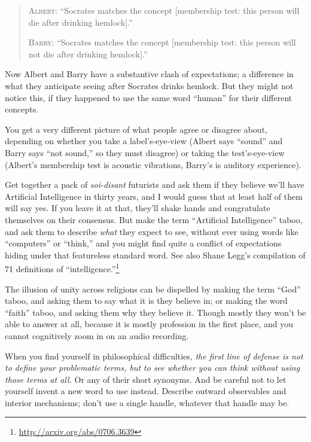 {{\begin{quotation}
{
 \textsc{Albert}: ``Socrates matches the concept
[membership test: this person will die after drinking
hemlock].''}

{
 \textsc{Barry}: ``Socrates matches the concept [membership
test: this person will not die after drinking
hemlock].''}
\end{quotation}

{
 Now Albert and Barry have a substantive clash of expectations; a
difference in what they anticipate seeing after Socrates drinks
hemlock. But they might not notice this, if they happened to use the
same word ``human'' for their
different concepts.}

{
 You get a very different picture of what people agree or disagree
about, depending on whether you take a label's-eye-view
(Albert says ``sound'' and Barry
says ``not sound,'' so they must
disagree) or taking the test's-eye-view
(Albert's membership test is acoustic vibrations,
Barry's is auditory experience).}

{
 Get together a pack of \textit{soi-disant} futurists and ask them
if they believe we'll have Artificial Intelligence in
thirty years, and I would guess that at least half of them will say
yes. If you leave it at that, they'll shake hands and
congratulate themselves on their consensus. But make the term
``Artificial Intelligence'' taboo,
and ask them to describe \textit{what} they expect to see, without ever
using words like ``computers'' or
``think,'' and you might find quite
a conflict of expectations hiding under that featureless standard word.
See also Shane Legg's compilation of 71 definitions of
``intelligence.''\footnote{\url{http://arxiv.org/abs/0706.3639}}}

{
 The illusion of unity across religions can be dispelled by making
the term ``God'' taboo, and asking
them to say what it is they believe in; or making the word
``faith'' taboo, and asking them why
they believe it. Though mostly they won't be able to
answer at all, because it is mostly profession in the first place, and
you cannot cognitively zoom in on an audio recording.}

{
 When you find yourself in philosophical difficulties, \textit{the
first line of defense is not to define your problematic terms, but to
see whether you can think without using those terms at all.} Or any of
their short synonyms. And be careful not to let yourself invent a new
word to use instead. Describe outward observables and interior
mechanisms; don't use a single handle, whatever that
handle may be.}

}}
